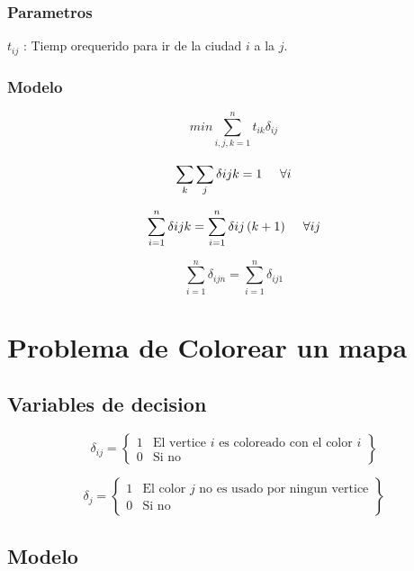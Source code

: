 \documentclass[]{article}
\begin{document}
\subsubsection{Parametros}

$t_{ij} $ : Tiemp orequerido para ir de la ciudad $i$ a la $j$. 

\subsubsection{Modelo}



$$min \sum_{i,j,k=1}^{n} t_{ik} \delta_{ij}$$

$$\sum_{k}^{} \sum_{j}^{}  \delta{ijk} =  1 \hspace*{0.5cm} \forall i  $$


$$\sum_{i=1}^{n} \delta{ijk} =  \sum_{i=1}^{n} \delta{ij \left(k+1\right)}  \hspace{0.5cm}\forall i j$$

$$\sum_{i=1}^{n} \delta_{ijn} =  \sum_{i=1}^{n} \delta_{ij1}$$

\section{Problema de Colorear un mapa} 

\subsection{Variables de decision} 
\begin{equation*}
\delta_{ij} = 
 \left\{ \begin{array}{cl}
 1 & \mbox{El vertice $i$ es coloreado con el color $i$}\\
 0 & \mbox{Si no}
 \end{array} \right\}
\end{equation*}

\begin{equation*}
\delta_{j} = 
\left\{ \begin{array}{cl}
1 & \mbox{El color $j$ no es usado por ningun vertice}\\
0 & \mbox{Si no}
\end{array} \right\}
\end{equation*}

\subsection{Modelo} 
\end{document}
